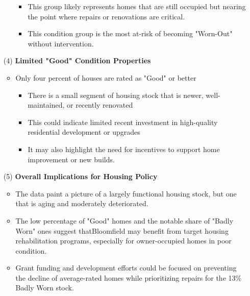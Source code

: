 \begin{itemize}
\begin{itemize}
\begin{itemize}
            \item This group likely represents homes that are still occupied but nearing the point where repairs or renovations are critical.
            \item This condition group is the most at-risk of becoming "Worn-Out" without intervention.
        \end{itemize}
    \end{itemize}
    \item [(4)] \textbf{\textcolor{coBalt}{Limited "Good" Condition Properties}}
    \begin{itemize}
        \item Only four percent of houses are rated as "Good" or better
        \begin{itemize}
            \item There is a small segment of housing stock that is newer, well-maintained, or recently renovated
            \item This could indicate limited recent investment in high-quality residential development or upgrades
            \item It may also highlight the need for incentives to support home improvement or new builds.
        \end{itemize}
    \end{itemize}
    \pagebreak
    \item [(5)] \textbf{\textcolor{coBalt}{Overall Implications for Housing Policy}}
    \begin{itemize}
        \item The data paint a picture of a largely functional housing stock, but one that is aging and moderately deteriorated.
        \item The low percentage of "Good" homes and the notable share of "Badly Worn" ones suggest thatBloomfield may benefit from target housing rehabilitation programs, especially for owner-occupied homes in poor condition.
        \item Grant funding and development efforts could be focused on preventing the decline of average-rated homes while prioritizing repairs for the 13\% Badly Worn stock.
    \end{itemize}
\end{itemize}

\newpage
\thispagestyle{empty}
\begin{landscape}
    
\end{landscape}
\newpage


